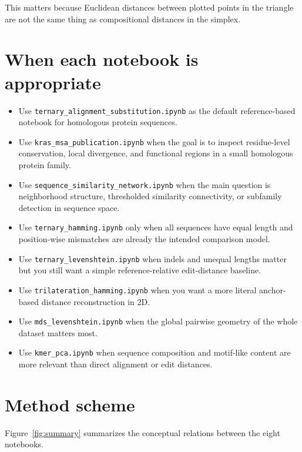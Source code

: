 \documentclass[11pt,a4paper]{article}
\begin{document}
This matters because Euclidean distances between plotted points in the triangle are not the same thing as compositional distances in the simplex.

\section{When each notebook is appropriate}

\begin{itemize}[leftmargin=*]
\item Use \texttt{ternary\_alignment\_substitution.ipynb} as the default reference-based notebook for homologous protein sequences.
\item Use \texttt{kras\_msa\_publication.ipynb} when the goal is to inspect residue-level conservation, local divergence, and functional regions in a small homologous protein family.
\item Use \texttt{sequence\_similarity\_network.ipynb} when the main question is neighborhood structure, thresholded similarity connectivity, or subfamily detection in sequence space.
\item Use \texttt{ternary\_hamming.ipynb} only when all sequences have equal length and position-wise mismatches are already the intended comparison model.
\item Use \texttt{ternary\_levenshtein.ipynb} when indels and unequal lengths matter but you still want a simple reference-relative edit-distance baseline.
\item Use \texttt{trilateration\_hamming.ipynb} when you want a more literal anchor-based distance reconstruction in 2D.
\item Use \texttt{mds\_levenshtein.ipynb} when the global pairwise geometry of the whole dataset matters most.
\item Use \texttt{kmer\_pca.ipynb} when sequence composition and motif-like content are more relevant than direct alignment or edit distances.
\end{itemize}

\section{Method scheme}

Figure~\ref{fig:summary} summarizes the conceptual relations between the eight notebooks.
\end{document}
